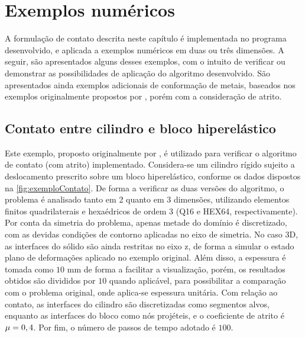 \documentclass[Tese.tex]{subfiles}
\begin{document}
\section{Exemplos numéricos}\label{sec:contato-exemplos}

A formulação de contato descrita neste capítulo é implementada no programa desenvolvido, e aplicada a exemplos numéricos em duas ou três dimensões. A seguir, são apresentados alguns desses exemplos, com o intuito de verificar ou demonstrar as possibilidades de aplicação do algoritmo desenvolvido. São apresentados ainda exemplos adicionais de conformação de metais, baseados nos exemplos originalmente propostos por , porém com a consideração de atrito.

\subsection{Contato entre cilindro e bloco hiperelástico}\label{subsec:contato1}

Este exemplo, proposto originalmente por , é utilizado para verificar o algoritmo de contato (com atrito) implementado. Considera-se um cilindro rígido sujeito a deslocamento prescrito sobre um bloco hiperelástico, conforme os dados dispostos na \autoref{fig:exemploContato}. De forma a verificar as duas versões do algoritmo, o problema é analisado tanto em 2 quanto em 3 dimensões, utilizando elementos finitos quadrilaterais e hexaédricos de ordem 3 (Q16 e HEX64, respectivamente). Por conta da simetria do problema, apenas metade do domínio é discretizado, com as devidas condições de contorno aplicadas no eixo de simetria. No caso 3D, as interfaces do sólido são ainda restritas no eixo z, de forma a simular o estado plano de deformações aplicado no exemplo original. Além disso, a espessura é tomada como $10$ mm de forma a facilitar a visualização, porém, os resultados obtidos são divididos por $10$ quando aplicável, para possibilitar a comparação com o problema original, onde aplica-se espessura unitária. Com relação ao contato, as interfaces do cilindro são discretizadas como segmentos alvos, enquanto as interfaces do bloco como nós projéteis, e o coeficiente de atrito é $\mu = 0,4$. Por fim, o número de passos de tempo adotado é $100$.
\end{document}
